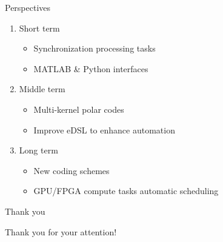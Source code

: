 \begin{frame}{Perspectives}
  \vfill
  \begin{enumerate}
    \item Short term
    \begin{itemize}
      \item Synchronization processing tasks
      \item MATLAB \& Python interfaces
    \end{itemize}
    \vspace{0.3cm}
    \pause
    \item Middle term
    \begin{itemize}
      \item Multi-kernel polar codes
      \item Improve eDSL to enhance automation
    \end{itemize}
    \vspace{0.3cm}
    \pause
    \item Long term
    \begin{itemize}
      \item New coding schemes
      \item GPU/FPGA compute tasks automatic scheduling
    \end{itemize}
  \end{enumerate}
  \vfill
\end{frame}

\begin{frame}[c]{Thank you}
  \begin{center}
  {\Large Thank you for your attention!}
  \end{center}
\end{frame}